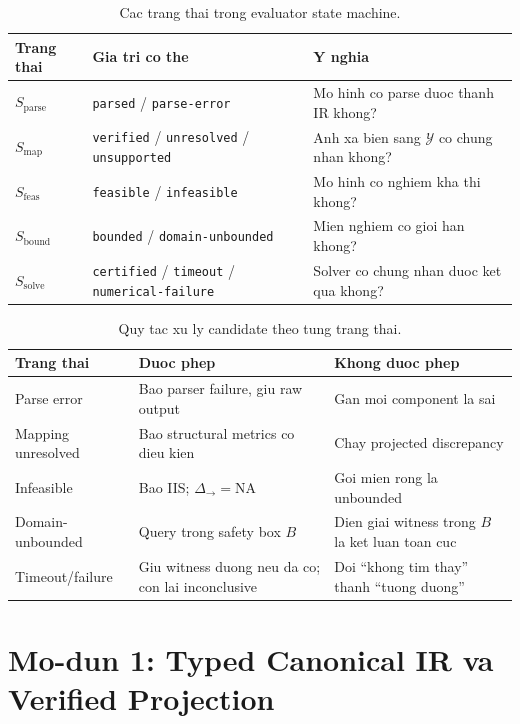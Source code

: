 \documentclass[11pt,a4paper]{article}
\begin{document}
\begin{table}[htbp]
\centering
\caption{Cac trang thai trong evaluator state machine.}
\small
\begin{tabularx}{\textwidth}{L{3cm} L{4cm} Y}
\toprule
\textbf{Trang thai} & \textbf{Gia tri co the} & \textbf{Y nghia} \\
\midrule
$S_{\mathrm{parse}}$  & \texttt{parsed} / \texttt{parse-error}
  & Mo hinh co parse duoc thanh IR khong? \\
$S_{\mathrm{map}}$    & \texttt{verified} / \texttt{unresolved} / \texttt{unsupported}
  & Anh xa bien sang $\mathcal{Y}$ co chung nhan khong? \\
$S_{\mathrm{feas}}$   & \texttt{feasible} / \texttt{infeasible}
  & Mo hinh co nghiem kha thi khong? \\
$S_{\mathrm{bound}}$  & \texttt{bounded} / \texttt{domain-unbounded}
  & Mien nghiem co gioi han khong? \\
$S_{\mathrm{solve}}$  & \texttt{certified} / \texttt{timeout} / \texttt{numerical-failure}
  & Solver co chung nhan duoc ket qua khong? \\
\bottomrule
\end{tabularx}
\end{table}

\begin{table}[htbp]
\centering
\caption{Quy tac xu ly candidate theo tung trang thai.}
\small
\begin{tabularx}{\textwidth}{L{3.2cm} Y Y}
\toprule
\textbf{Trang thai} & \textbf{Duoc phep} & \textbf{Khong duoc phep} \\
\midrule
Parse error
  & Bao parser failure, giu raw output
  & Gan moi component la sai \\
Mapping unresolved
  & Bao structural metrics co dieu kien
  & Chay projected discrepancy \\
Infeasible
  & Bao IIS; $\Delta_{\to} = \mathrm{NA}$
  & Goi mien rong la unbounded \\
Domain-unbounded
  & Query trong safety box $B$
  & Dien giai witness trong $B$ la ket luan toan cuc \\
Timeout/failure
  & Giu witness duong neu da co; con lai inconclusive
  & Doi ``khong tim thay'' thanh ``tuong duong'' \\
\bottomrule
\end{tabularx}
\end{table}

\section{Mo-dun 1: Typed Canonical IR va Verified Projection}
\end{document}
